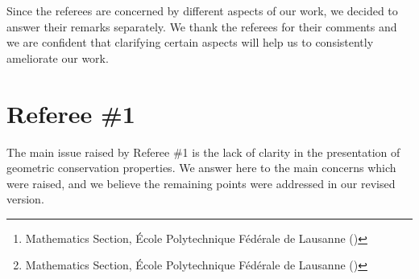 \documentclass{siamart1116}
\title{{\TheTitle}}
\author{Assyr Abdulle\thanks{Mathematics Section, \'Ecole Polytechnique F\'ed\'erale de Lausanne (\email{assyr.abdulle@epfl.ch})}
		\and
		Giacomo Garegnani\thanks{Mathematics Section, \'Ecole Polytechnique F\'ed\'erale de Lausanne (\email{giacomo.garegnani@epfl.ch})}}
\numberwithin{theorem}{section}
\begin{document}
\maketitle	

Since the referees are concerned by different aspects of our work, we decided to answer their remarks separately. We thank the referees for their comments and we are confident that clarifying certain aspects will help us to consistently ameliorate our work. 

\section*{Referee \#1} 
The main issue raised by Referee \#1 is the lack of clarity in the presentation of geometric conservation properties. We answer here to the main concerns which were raised, and we believe the remaining points were addressed in our revised version.
\end{document}
